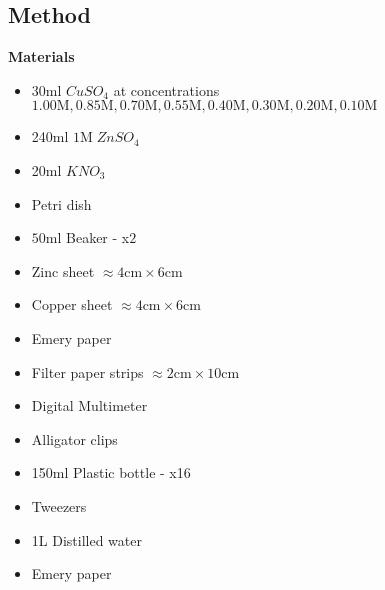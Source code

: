 \documentclass[10.5pt,a4paper]{article}
\begin{document}
\subsection{Method}
\textbf{Materials}
\begin{itemize}
	\item 30ml $CuSO_4$ at concentrations $1.00\textrm{M}, 0.85\textrm{M}, 0.70\textrm{M}, 0.55\textrm{M}, 0.40\textrm{M}, 0.30\textrm{M}, 0.20\textrm{M}, 0.10\textrm{M}$
	\item 240ml $1$M$\;ZnSO_4$
	\item 20ml $KNO_3$
	\item Petri dish
	\item $50\textrm{ml}$ Beaker - x$2$
	\item Zinc sheet $\approx4\textrm{cm}\times6\textrm{cm}$ 
	\item Copper sheet $\approx4\textrm{cm}\times6\textrm{cm}$ 
	\item Emery paper
	\item Filter paper strips $\approx 2\textrm{cm}\times10\textrm{cm}$
	\item Digital Multimeter
	\item Alligator clips
	\item 150ml Plastic bottle - x16
	\item Tweezers 
	\item 1L Distilled water
	\item Emery paper
\end{itemize}
\end{document}
